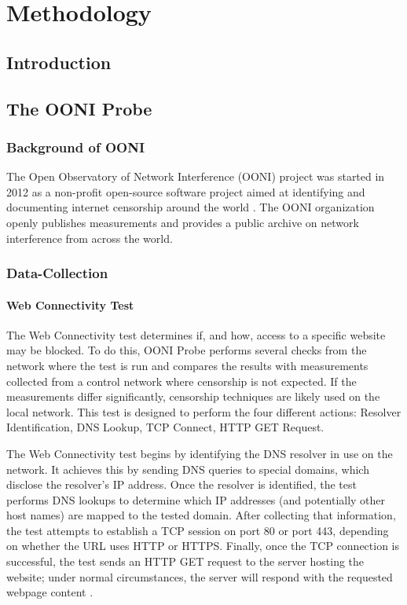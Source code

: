 \chapter{Methodology}
\section{Introduction}



\section{The OONI Probe}

\subsection{Background of OONI}

The Open Observatory of Network Interference (OONI) project was started in 2012 as a non-profit open-source software project aimed at identifying and documenting internet censorship around the world \cite{ooniAbout}. The OONI organization openly publishes measurements and provides a public archive on network interference from across the world. 

\subsection{Data-Collection}



\subsubsection{Web Connectivity Test}

The Web Connectivity test determines if, and how, access to a specific website may be blocked. To do this, OONI Probe performs several checks from the network where the test is run and compares the results with measurements collected from a control network where censorship is not expected. If the measurements differ significantly, censorship techniques are likely used on the local network. This test is designed to perform the four different actions: Resolver Identification, DNS Lookup, TCP Connect, HTTP GET Request.

The Web Connectivity test begins by identifying the DNS resolver in use on the network. It achieves this by sending DNS queries to special domains, which disclose the resolver’s IP address. Once the resolver is identified, the test performs DNS lookups to determine which IP addresses (and potentially other host names) are mapped to the tested domain. After collecting that information, the test attempts to establish a TCP session on port 80 or port 443, depending on whether the URL uses HTTP or HTTPS. Finally, once the TCP connection is successful, the test sends an HTTP GET request to the server hosting the website; under normal circumstances, the server will respond with the requested webpage content \cite{ooniConnectivityTest}.

